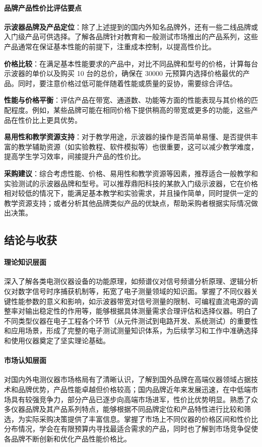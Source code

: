 \documentclass[./测控三级项目.tex]{subfiles} %
\begin{document}
			\paragraph{\qquad 品牌产品性价比评估要点}\par
			\textbf{示波器品牌及产品定位}：除了上述提到的国内外知名品牌外，还有一些二线品牌或入门级产品可供选择。了解各品牌针对教育和一般测试市场推出的产品系列，这些产品通常在保证基本性能的前提下，注重成本控制，以提高性价比。\par
			\textbf{价格比较}：在满足基本性能要求的产品中，对比不同品牌和型号的价格，计算每台示波器的单价以及购买 10 台的总价，确保在 30000 元预算内选择价格最优的产品。同时，要注意价格过低可能伴随着性能或质量的妥协，需要综合评估。\par
			\textbf{性能与价格平衡}：评估产品在带宽、通道数、功能等方面的性能表现与其价格的匹配程度。例如，某些品牌可能在相同价格下提供稍高的带宽或更多的功能，这些产品在性价比上更具优势。\par
			\textbf{易用性和教学资源支持}：对于教学用途，示波器的操作是否简单易懂、是否提供丰富的教学辅助资源（如实验教程、软件模拟等）也很重要，这可以减少教学难度，提高学生学习效率，间接提升产品的性价比。\par
			\textbf{采购建议}：综合考虑性能、价格、易用性和教学资源等因素，推荐适合一般教学和实验测试的示波器品牌和型号。可以推荐鼎阳科技的某款入门级示波器，它在价格相对较低的情况下，能满足基本教学和实验需求，并且操作简单，同时提供一定的教学资源支持；或者分析其他品牌类似产品的优缺点，帮助采购者根据实际情况做出决策。\par
			
			
	\subsection{结论与收获}
		\paragraph{\qquad 理论知识层面}
		深入了解各类电测仪器设备的功能原理，如频谱仪对信号频谱分析原理、逻辑分析仪对数字信号时序捕获机制等，拓宽了电子测量领域的知识面。掌握了不同仪器关键性能参数的意义和影响，如示波器带宽对信号测量的限制、可编程直流电源的调整率对输出稳定性的作用等，能够根据具体测量需求合理评估和选择仪器。明白了不同类型仪器在电子工程各个环节（从元件测试到电路开发、系统测试）的重要性和应用场景，形成了完整的电子测试测量知识体系，为后续学习和工作中准确选择和使用仪器奠定了坚实理论基础。
		\paragraph{\qquad 市场认知层面}
		对国内外电测仪器市场格局有了清晰认识，了解到国外品牌在高端仪器领域占据技术和品牌优势，产品性能卓越但价格较高；国内品牌近年来发展迅速，在中低端市场具有较强竞争力，部分产品已逐步向高端市场进军，性价比优势明显。熟悉了众多仪器品牌及其产品系列特点，能够根据不同品牌定位和产品特性进行比较和筛选，为实际采购决策提供了丰富信息。掌握了市场上不同仪器的价格区间和性价比分布情况，学会在有限预算内寻找最适合需求的产品，同时也了解到市场竞争促使各品牌不断创新和优化产品性能价格比。
\end{document}

